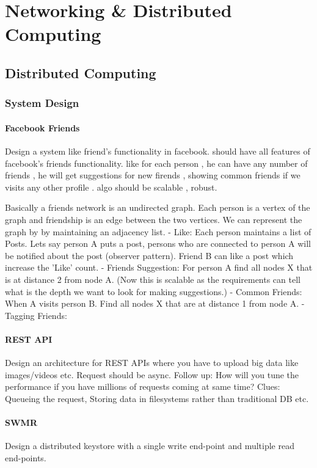 \chapter{Networking \& Distributed Computing}
\section{Distributed Computing}
\subsection{System Design}
\subsubsection{Facebook Friends}
Design a system like friend's functionality in facebook. should have all features of facebook's friends functionality. like for each person , he can have any number of friends , 
he will get suggestions for new firends , showing common friends if we visits any other profile . algo should be scalable , robust.

Basically a friends network is an undirected graph. Each person is a vertex of the graph and friendship is an edge between the two vertices. We can represent the graph by by 
maintaining an adjacency list. 
- Like: Each person maintains a list of Posts. Lets say person A puts a post, persons who are connected to person A will be notified about the post (observer pattern). Friend B 
can like a post which increase the 'Like' count. 
- Friends Suggestion: For person A find all nodes X that is at distance 2 from node A. (Now this is scalable as the requirements can tell what is the depth we want to look for 
making suggestions.) 
- Common Friends: When A visits person B. Find all nodes X that are at distance 1 from node A.
- Tagging Friends: 

\subsubsection{REST API}
Design an architecture for REST APIs where you have to upload big data like images/videos etc. Request should be async. Follow up: How will you tune the performance if you have 
millions of requests coming at same time? Clues: Queueing the request, Storing data in filesystems rather than traditional DB etc.

\subsubsection{SWMR}
Design a distributed keystore with a single write end-point and multiple read end-points.


